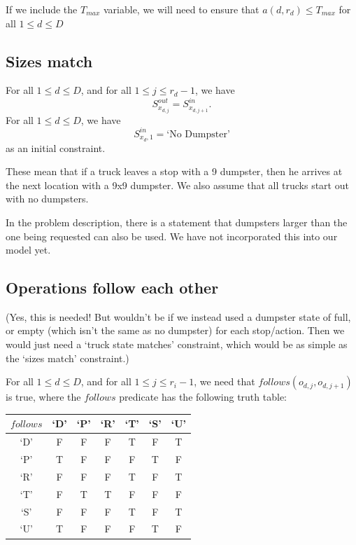 \documentclass{article}
\begin{document}
If we include the $T_{max}$ variable, we will need to ensure that $a(d,r_d) \le T_{max}$ for all $1 \le d \le D$

\subsection {Sizes match}

For all $1 \le d \le D$, and for all $1 \le j \le r_d - 1$, we have
$$S^{out}_{x_{d,j}} = S^{in}_{x_{d,j+1}}.$$
For all $1 \le d \le D$, we have
$$S^{in}_{x_d,1} = \mbox{`No Dumpster'} $$
as an initial constraint.

These mean that if a truck leaves a stop with a 9 dumpster, then he arrives at the next location with a 9x9 dumpster.
We also assume that all trucks start out with no dumpsters.

In the problem description, there is a statement that dumpsters larger than the one being requested can also be used.
We have not incorporated this into our model yet.

\subsection {Operations follow each other}
(Yes, this is needed! But wouldn't be if we instead used a dumpster state of full, or empty (which isn't the same as no dumpster) for each stop/action.
Then we would just need a `truck state matches' constraint, which would be as simple as the `sizes match' constraint.)

For all $1 \le d \le D$, and for all $1 \le j \le r_i - 1$, we need that $follows(o_{d, j}, o_{d, j+1})$ is true, where the $follows$ predicate has the following truth table:

\begin{tabular}{ c | c c c c c c }
 $follows$    & `D' & `P' & `R' & `T' & `S' & `U' \\
 \hline
 `D'          & F   & F   & F   & T   & F   & T   \\
 `P'          & T   & F   & F   & F   & T   & F   \\
 `R'          & F   & F   & F   & T   & F   & T   \\
 `T'          & F   & T   & T   & F   & F   & F   \\
 `S'          & F   & F   & F   & T   & F   & T   \\
 `U'          & T   & F   & F   & F   & T   & F   \\
\end{tabular}
\end{document}
